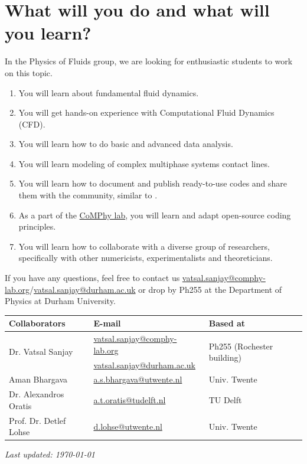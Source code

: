 \documentclass[11pt]{article}
\begin{document}
\section*{What will you do and what will you learn?}
In the Physics of Fluids group, we are looking for enthusiastic students to work on this topic.
\begin{enumerate}
\itemsep0em
\item You will learn about fundamental fluid dynamics.
\item You will get hands-on experience with Computational Fluid Dynamics (CFD).
\item You will learn how to do basic and advanced data analysis.
\item You will learn modeling of complex multiphase systems contact lines. 
\item You will learn how to document and publish ready-to-use codes and share them with the community, similar to \citet{basiliskVatsal, basiliskVatsalDropFilm, basiliskVatsalViscousBouncing}. 
\item As a part of the \href{https://comphy-lab.org}{CoMPhy lab}, you will learn and adapt open-source coding principles. 
\item You will learn how to collaborate with a diverse group of researchers, specifically with other numericists, experimentalists and theoreticians.
\end{enumerate}

If you have any questions, feel free to contact us \href{mailto:vatsal.sanjay@comphy-lab.org}{vatsal.sanjay@comphy-lab.org}/\href{mailto:vatsal.sanjay@durham.ac.uk}{vatsal.sanjay@durham.ac.uk} or drop by Ph255 at the Department of Physics at Durham University.
\begin{center}
\begin{tabular}{|l|l|l|}
\hline \textbf{Collaborators} & \textbf{E-mail} & \textbf{Based at} \\
\hline \multirow{2}{*}{Dr. Vatsal Sanjay} & \href{mailto:vatsal.sanjay@comphy-lab.org}{vatsal.sanjay@comphy-lab.org} & \multirow{2}{*}{Ph255 (Rochester building)} \\
& \href{mailto:vatsal.sanjay@durham.ac.uk}{vatsal.sanjay@durham.ac.uk} & \\
\hline Aman Bhargava & \href{mailto:a.s.bhargava@utwente.nl}{a.s.bhargava@utwente.nl} & Univ. Twente \\
\hline Dr. Alexandros Oratis   & \href{mailto:a.t.oratis@tudelft.nl}{a.t.oratis@tudelft.nl}& TU Delft \\
\hline Prof. Dr. Detlef Lohse & \href{mailto:d.lohse@utwente.nl}{d.lohse@utwente.nl} & Univ. Twente  \\
\hline
\end{tabular}
\end{center}

\vspace{1em}
\noindent\textit{Last updated: \today}

\printbibliography
\end{document}

